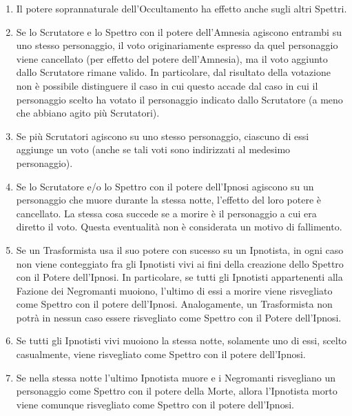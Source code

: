 \documentclass[a4paper,10pt]{article}
\begin{document}
\begin{enumerate}
 \item Il potere soprannaturale dell'Occultamento ha effetto anche sugli altri Spettri.
 
 \item Se lo Scrutatore e lo Spettro con il potere dell'Amnesia agiscono entrambi
 su uno stesso personaggio, il voto originariamente espresso da quel personaggio
 viene cancellato (per effetto del potere dell'Amnesia), ma il voto aggiunto dallo
 Scrutatore rimane valido.
 In particolare, dal risultato della votazione non è possibile distinguere il caso in
 cui questo accade dal caso in cui il personaggio scelto ha votato il personaggio indicato
 dallo Scrutatore (a meno che abbiano agito più Scrutatori).
 
 \item Se più Scrutatori agiscono su uno stesso personaggio, ciascuno di essi aggiunge
 un voto (anche se tali voti sono indirizzati al medesimo personaggio).
 
 \item Se lo Scrutatore e/o lo Spettro con il potere dell'Ipnosi agiscono su un personaggio che muore durante la stessa notte,
 l'effetto del loro potere è cancellato. 
 La stessa cosa succede se a morire è il personaggio a cui era diretto il voto.
 Questa eventualità non è considerata un motivo di fallimento.
 
 \item Se un Trasformista usa il suo potere con sucesso su un Ipnotista, in ogni caso non viene conteggiato fra gli Ipnotisti
 vivi ai fini della creazione dello Spettro con il Potere dell'Ipnosi. In particolare, se tutti gli Ipnotisti appartenenti alla
 Fazione dei Negromanti muoiono, l'ultimo di essi a morire viene risvegliato come Spettro con il potere dell'Ipnosi. Analogamente,
 un Trasformista non potrà in nessun caso essere risvegliato come Spettro con il Potere dell'Ipnosi.
 
 \item Se tutti gli Ipnotisti vivi muoiono la stessa notte, solamente uno di essi, scelto casualmente,
 viene risvegliato come Spettro con il potere dell'Ipnosi.
 
 \item Se nella stessa notte l'ultimo Ipnotista muore e i Negromanti risvegliano un personaggio come Spettro con il potere
 della Morte, allora l'Ipnotista morto viene comunque risvegliato come Spettro con il potere dell'Ipnosi.
\end{enumerate}


\printindex
\end{document}
